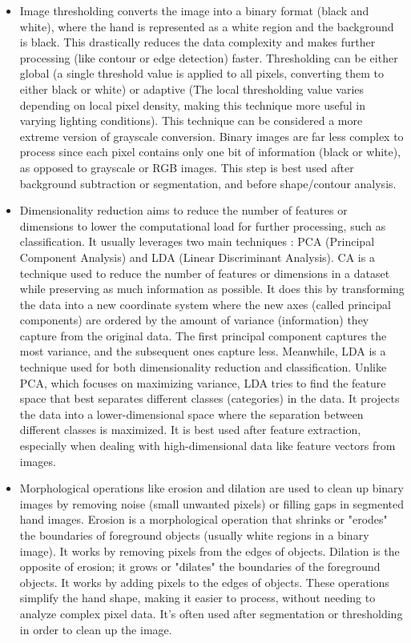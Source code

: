 \documentclass[12pt]{article}
\begin{document}
\begin{itemize}
  \item Image thresholding converts the image into a binary format (black and white), where the hand is represented as a white region and the background is black. This drastically reduces the data complexity and makes further processing (like contour or edge detection) faster. Thresholding can be either global (a single threshold value is applied to all pixels, converting them to either black or white) or adaptive (The local thresholding value varies depending on local pixel density, making this technique more useful in varying lighting conditions). This technique can be considered a more extreme version of grayscale conversion. Binary images are far less complex to process since each pixel contains only one bit of information (black or white), as opposed to grayscale or RGB images. This step is best used after background subtraction or segmentation, and before shape/contour analysis.
  \item Dimensionality reduction aims to reduce the number of features or dimensions to lower the computational load for further processing, such as classification. It usually leverages two main techniques : PCA (Principal Component Analysis) and LDA (Linear Discriminant Analysis). CA is a technique used to reduce the number of features or dimensions in a dataset while preserving as much information as possible. It does this by transforming the data into a new coordinate system where the new axes (called principal components) are ordered by the amount of variance (information) they capture from the original data. The first principal component captures the most variance, and the subsequent ones capture less. Meanwhile, LDA is a technique used for both dimensionality reduction and classification. Unlike PCA, which focuses on maximizing variance, LDA tries to find the feature space that best separates different classes (categories) in the data. It projects the data into a lower-dimensional space where the separation between different classes is maximized. It is best used after feature extraction, especially when dealing with high-dimensional data like feature vectors from images.
  \item Morphological operations like erosion and dilation are used to clean up binary images by removing noise (small unwanted pixels) or filling gaps in segmented hand images. Erosion is a morphological operation that shrinks or "erodes" the boundaries of foreground objects (usually white regions in a binary image). It works by removing pixels from the edges of objects. Dilation is the opposite of erosion; it grows or "dilates" the boundaries of the foreground objects. It works by adding pixels to the edges of objects. These operations simplify the hand shape, making it easier to process, without needing to analyze complex pixel data. It's often used after segmentation or thresholding in order to clean up the image.

\end{itemize}
\end{document}
